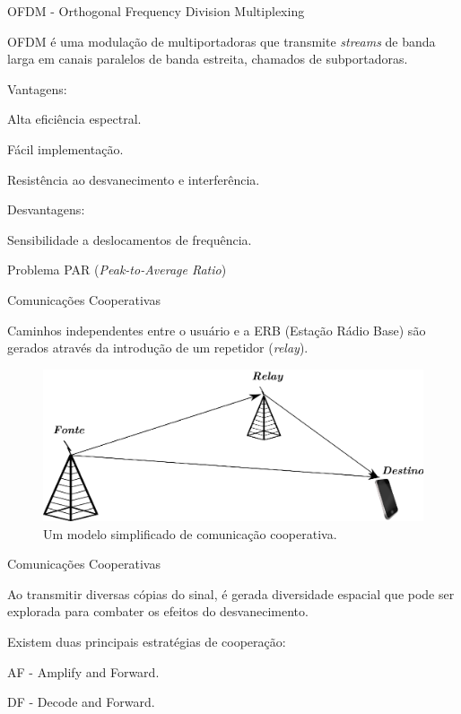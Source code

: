 \begin{frame}{OFDM - Orthogonal Frequency Division Multiplexing}
 \begin{bigitem}
  \item OFDM é uma modulação de multiportadoras que transmite \textit{streams} de banda larga em canais paralelos de banda estreita, chamados de subportadoras.
  \item Vantagens:
    \begin{bigitem}
      \item Alta eficiência espectral.
      \item Fácil implementação.
      \item Resistência ao desvanecimento e interferência.
    \end{bigitem}
    \item Desvantagens:
    \begin{bigitem}
      \item Sensibilidade a deslocamentos de frequência.
      \item Problema PAR (\textit{Peak-to-Average Ratio})
    \end{bigitem}
 \end{bigitem}
\end{frame}

\begin{frame}{Comunicações Cooperativas}
 \begin{bigitem}
   \item Caminhos independentes entre o usuário e a ERB (Estação Rádio Base) são gerados através da introdução de um repetidor (\textit{relay}).
   \begin{figure}[!htb]
   \centering
   \includegraphics[width=0.60\linewidth]{../Imagens/relay_opt2.eps}
   \caption{Um modelo simplificado de comunicação cooperativa.}\label{fig:relay_ch}
  \end{figure}
 \end{bigitem}
\end{frame}


\begin{frame}{Comunicações Cooperativas}
  \begin{bigitem}
   \item Ao transmitir diversas cópias do sinal, é gerada diversidade espacial que pode ser explorada para combater os efeitos do desvanecimento.
   \item Existem duas principais estratégias de cooperação:
   \begin{bigitem}
      \item AF - Amplify and Forward.
      \item DF - Decode and Forward.
   \end{bigitem}  
  \end{bigitem}  
\end{frame}

